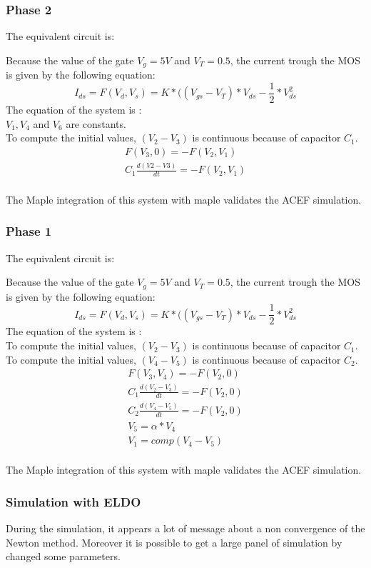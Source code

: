 \subsubsection{Phase 2}
The equivalent circuit is:

Because the value of the gate $V_{g}=5V$ and $V_{T}=0.5$, the current trough the MOS is given by the following equation:
\[I_{ds}=F(V_{d},V_{s})=K *((V_{gs}-V_{T})*V_{ds} - \frac{1}{2}*V_{ds}^2 \]
The equation of the system is :\\
$V_{1}, V_{4}$ and $V_{6}$ are constants.\\
To compute the initial values, $(V_{2} - V_{3})$ is continuous because of capacitor $C_{1}$.
\begin{eqnarray}
F(V_{3},0)=-F(V_{2},V_{1})\\
C_{1}\frac{d(V2-V3)}{dt} = -F(V_{2},V_{1})\\
\end{eqnarray}

The Maple integration of this system with maple validates the ACEF simulation.

\subsubsection{Phase 1}
The equivalent circuit is:

Because the value of the gate $V_{g}=5V$ and $V_{T}=0.5$, the current trough the MOS is given by the following equation:
\[I_{ds}=F(V_{d},V_{s})=K *((V_{gs}-V_{T})*V_{ds} - \frac{1}{2}*V_{ds}^2 \]
The equation of the system is :\\
To compute the initial values, $(V_{2} - V_{3})$ is continuous because of capacitor $C_{1}$.
To compute the initial values, $(V_{4} - V_{5})$ is continuous because of capacitor $C_{2}$.
\begin{eqnarray}
F(V_{3},V_{4})=-F(V_{2},0)\\
C_{1}\frac{d(V_{2}-V_{3})}{dt} = -F(V_{2},0)\\
C_{2}\frac{d(V_{4}-V_{5})}{dt} = -F(V_{2},0)\\
V_{5}=\alpha*V_{4}\\
V_{1}=comp(V_{4}-V_{5})\\
\end{eqnarray}

The Maple integration of this system with maple validates the ACEF simulation.

\subsubsection{Simulation with ELDO}
During the simulation, it appears a lot of message about a non convergence of the Newton method.
Moreover it is possible to get a large panel of simulation by changed some parameters.

\newpage
